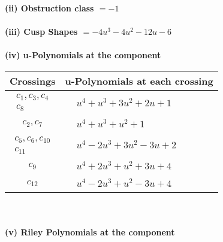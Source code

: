 \documentclass[1p]{elsarticle_modified}
\theoremstyle{definition}
\begin{document}
\flushleft \textbf{(ii) Obstruction class $= -1$}\\~\\
\flushleft \textbf{(iii) Cusp Shapes $= -4 u^3-4 u^2-12 u-6$}\\~\\
\newpage\renewcommand{\arraystretch}{1}
\flushleft \textbf{(iv) u-Polynomials at the component}\newline \\
\begin{tabular}{m{50pt}|m{274pt}}
Crossings & \hspace{64pt}u-Polynomials at each crossing \\
\hline $$\begin{aligned}c_{1},c_{3},c_{4}\\c_{8}\end{aligned}$$&$\begin{aligned}
&u^4+u^3+3 u^2+2 u+1
\end{aligned}$\\
\hline $$\begin{aligned}c_{2},c_{7}\end{aligned}$$&$\begin{aligned}
&u^4+u^3+u^2+1
\end{aligned}$\\
\hline $$\begin{aligned}c_{5},c_{6},c_{10}\\c_{11}\end{aligned}$$&$\begin{aligned}
&u^4-2 u^3+3 u^2-3 u+2
\end{aligned}$\\
\hline $$\begin{aligned}c_{9}\end{aligned}$$&$\begin{aligned}
&u^4+2 u^3+u^2+3 u+4
\end{aligned}$\\
\hline $$\begin{aligned}c_{12}\end{aligned}$$&$\begin{aligned}
&u^4-2 u^3+u^2-3 u+4
\end{aligned}$\\
\hline
\end{tabular}\\~\\
\newpage\renewcommand{\arraystretch}{1}
\flushleft \textbf{(v) Riley Polynomials at the component}\newline \\
\end{document}
